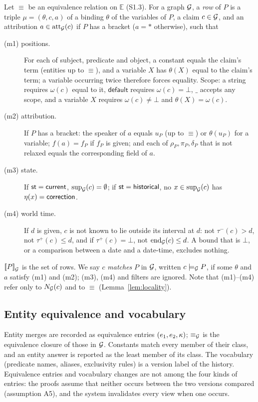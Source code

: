 Let $\equiv$ be an equivalence relation on $\mathbb E$ (S1.3). For a graph $\mathcal G$, a \emph{row} of
$P$ is a triple $\mu=(\theta,c,a)$ of a binding $\theta$ of the variables of $P$, a claim
$c\in\mathcal G$, and an attribution $a\in\mathrm{att}_\mathcal G(c)$ if $P$ has a bracket ($a=\ast$ otherwise), such
that
\begin{description}
\item[(m1) positions.] For each of subject, predicate and object, a constant equals the claim's
  term (entities up to $\equiv$), and a variable $X$ has $\theta(X)$ equal to the claim's term; a
  variable occurring twice therefore forces equality. Scope: a string requires $\omega(c)$ equal
  to it, $\mathsf{default}$ requires $\omega(c)=\bot$, $\_$ accepts any scope, and a variable $X$
  requires $\omega(c)\neq\bot$ and $\theta(X)=\omega(c)$.
\item[(m2) attribution.] If $P$ has a bracket: the speaker of $a$ equals $u_P$ (up to $\equiv$) or
  $\theta(u_P)$ for a variable; $f(a)=f_P$ if $f_P$ is given; and each of $\rho_P,\pi_P,\delta_P$
  that is not relaxed equals the corresponding field of $a$.
\item[(m3) state.] If $\textsf{st}=\textsf{current}$, $\mathrm{sup}_\mathcal G(c)=\emptyset$; if $\textsf{st}=\textsf{historical}$, no
  $x\in\mathrm{sup}_\mathcal G(c)$ has $\eta(x)=\textsf{correction}$.
\item[(m4) world time.] If $d$ is given, $c$ is not known to lie outside its interval at $d$:
  not $\tau^-(c)>d$, not $\tau^+(c)\le d$, and if $\tau^+(c)=\bot$, not $\mathrm{end}_\mathcal G(c)\le d$.
  A bound that is $\bot$, or a comparison between a date and a date-time, excludes nothing.
\end{description}
$[\![P]\!]_{\mathcal G}^{}$ is the set of rows. We say $c$ \emph{matches} $P$ in $\mathcal G$, written
$c\models_\mathcal G P$, if some $\theta$ and $a$ satisfy (m1) and (m2); (m3), (m4) and filters are
ignored. Note that (m1)--(m4) refer only to $N_\mathcal G(c)$ and to $\equiv$ (Lemma~\ref{lem:locality}).

\subsection{Entity equivalence and vocabulary}

Entity merges are recorded as equivalence entries $(e_1,e_2,\kappa)$; $\equiv_\mathcal G$ is the equivalence
closure of those in $\mathcal G$. Constants match every member of their class, and an entity answer is
reported as the least member of its class. The vocabulary (predicate names, aliases,
exclusivity rules) is a version label of the history. Equivalence entries and vocabulary changes
are not among the four kinds of entries: the proofs assume that neither occurs between the two
versions compared (assumption A5), and the system invalidates every view when one occurs.

